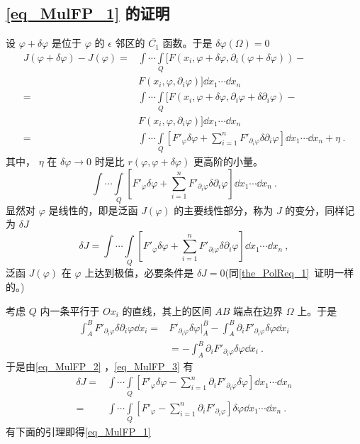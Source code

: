 \subsection{\autoref{eq_MulFP_1} 的证明}
设 $\varphi+\delta\varphi$ 是位于 $\varphi$ 的 $\epsilon$ 邻区的 $\overline{C_1}$ 函数。于是 $\delta{\varphi}(\Omega)=0$
\begin{equation}
\begin{aligned}
J(\varphi+\delta\varphi)-J(\varphi)=&\int\cdots\int\limits_Q [F(x_i,\varphi+\delta\varphi,\partial_i(\varphi+\delta\varphi))-\\
&F(x_i,\varphi,\partial_i\varphi)]\dd x_1\cdots\dd x_n\\
=&\int\cdots\int\limits_Q [F(x_i,\varphi+\delta\varphi,\partial_i\varphi+\delta\partial_i\varphi)-\\
&F(x_i,\varphi,\partial_i\varphi)]\dd x_1\cdots\dd x_n\\
=&\int\cdots\int\limits_Q [F'_\varphi\delta\varphi+\sum_{i=1}^nF'_{\partial_i\varphi}\delta\partial_i\varphi]\dd x_1\cdots\dd x_n+\eta~.
\end{aligned}
\end{equation}
其中， $\eta$ 在 $\delta\varphi\rightarrow0$ 时是比 $r(\varphi,\varphi+\delta\varphi)$ 更高阶的小量。
\begin{equation}
\int\cdots\int\limits_Q [F'_\varphi\delta\varphi+\sum_{i=1}^nF'_{\partial_i\varphi}\delta\partial_i\varphi]\dd x_1\cdots\dd x_n~.
\end{equation}
显然对 $\varphi$ 是线性的，即是泛函 $J(\varphi)$ 的主要线性部分，称为 $J$ 的变分，同样记为 $\delta J$
\begin{equation}\label{eq_MulFP_2}
\delta J=\int\cdots\int\limits_Q [F'_\varphi\delta\varphi+\sum_{i=1}^nF'_{\partial_i\varphi}\delta\partial_i\varphi]\dd x_1\cdots\dd x_n~,
\end{equation}
泛函 $J(\varphi)$ 在 $\varphi$ 上达到极值，必要条件是 $\delta J=0$(同\autoref{the_PolReq_1}~证明一样的。)

考虑 $Q$ 内一条平行于 $Ox_i$ 的直线，其上的区间 $AB$ 端点在边界 $\Omega$ 上。于是
\begin{equation}\label{eq_MulFP_3}
\begin{aligned}
\int_A^B F'_{\partial_i\varphi}\delta\partial_i\varphi\dd x_i=&F'_{\partial_i\varphi}\delta\varphi\Big|_A^B-\int_A^B \partial_iF'_{\partial_i\varphi}\delta\varphi\dd x_i\\
&=-\int_A^B \partial_iF'_{\partial_i\varphi}\delta\varphi\dd x_i~.
\end{aligned}
\end{equation}
于是由\autoref{eq_MulFP_2} ，\autoref{eq_MulFP_3} 有
\begin{equation}
\begin{aligned}
\delta J=&\int\cdots\int\limits_Q [F'_\varphi\delta\varphi-\sum_{i=1}^n\partial_iF'_{\partial_i\varphi}\delta\varphi]\dd x_1\cdots\dd x_n\\
=&\int\cdots\int\limits_Q [F'_\varphi-\sum_{i=1}^n\partial_iF'_{\partial_i\varphi}]\delta\varphi\dd x_1\cdots\dd x_n~.
\end{aligned}
\end{equation}
有下面的引理即得\autoref{eq_MulFP_1} 

